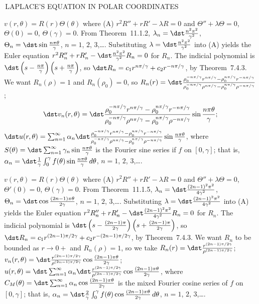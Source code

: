 \documentclass[dvips]{book}
\renewcommand{\exer}[1]{\par\medskip\;\noindent{\color{red}\bf #1.}}
\numberwithin{example}{section}
\numberwithin{equation}{section}
\numberwithin{theorem}{section}
\numberwithin{table}{section}
\numberwithin{figure}{section}
\begin{document}
\renewcommand{\thissection}{\sectiontitle
{\,LAPLACE'S EQUATION IN POLAR COORDINATES}}
\thissection

\vspace*{-17.5pt}

\exer{12.4.2}
 $v(r,\theta)=R(r)\Theta(\theta)$ where
(A) $r^2R''+rR'-\lambda R=0$ and
$\Theta''+\lambda\Theta=0$, $\Theta(0)=0$, $\Theta(\gamma)=0$.
From Theorem~11.1.2,
$\lambda_n=\dst\frac{n^2\pi^2}{\gamma^2}$,
 $\Theta_n=\dst\sin\frac
{n\pi\theta}{\gamma}$,
$n=1$,  $2$, $3$,\dots.
Substituting $\lambda=\dst\frac{n^2\pi^2}{\gamma^2}$ into (A) yields
the Euler equation
$r^2R_n''+rR_n'-\dst\frac{n^2\pi^2}{\gamma^2} R_n=0$
for $R_n$.
The indicial polynomial  is
$\dst
\left(s-\frac{n\pi}{\gamma}\right)
\left(s+\frac{n\pi}{\gamma}\right)$,
so
$\dst R_n=c_1r^{n\pi/\gamma}+c_2r^{-n\pi/\gamma}$,
by Theorem~7.4.3. We want $R_n(\rho)=1$ and $R_n(\rho_0)=0$, so
$R_n(r)=\dst\frac{\rho_0^{-n\pi/\gamma}r^{n\pi/\gamma}-\rho_0^{n\pi/\gamma}
r^{-n\pi/\gamma}}{\rho_0^{-n\pi/\gamma}\rho^{n\pi/\gamma}-\rho_0^{n\pi/\gamma}
\rho^{-n\pi/\gamma}}$;
$$
\dst v_n(r,\theta)=
\dst\frac{\rho_0^{-n\pi/\gamma}r^{n\pi/\gamma}-\rho_0^{n\pi/\gamma}
r^{-n\pi/\gamma}}{\rho_0^{-n\pi/\gamma}\rho^{n\pi/\gamma}-\rho_0^{n\pi/\gamma}
\rho^{-n\pi/\gamma}}
\sin\frac{n\pi\theta}{\gamma};
$$
$\dst u(r,\theta)=\sum_{n=1}^\infty\alpha_n
\dst\frac{\rho_0^{-n\pi/\gamma}r^{n\pi/\gamma}-\rho_0^{n\pi/\gamma}
r^{-n\pi/\gamma}}{\rho_0^{-n\pi/\gamma}\rho^{n\pi/\gamma}-\rho_0^{n\pi/\gamma}
\rho^{-n\pi/\gamma}}
\sin\frac{n\pi\theta}{\gamma}$,
where
$S(\theta)=\dst\sum_{n=1}^\infty\gamma_n\sin\frac{n\pi\theta}{\gamma}$
is the Fourier sine series if $f$ on $[0,\gamma]$; that is,
$\alpha_n=\dst\frac{1}{\gamma}\int_0^\gamma
f(\theta)\sin\frac{n\pi\theta}{\gamma}\,d\theta$, $n=1$, $2$,
$3$,\dots.


\exer{12.4.4}
 $v(r,\theta)=R(r)\Theta(\theta)$ where
(A) $r^2R''+rR'-\lambda R=0$ and
$\Theta''+\lambda\Theta=0$, $\Theta'(0)=0$, $\Theta(\gamma)=0$.
From Theorem~11.1.5,
$\lambda_n=\dst\frac{(2n-1)^2\pi^2}{4\gamma^2}$,
 $\Theta_n=\dst\cos\frac
{(2n-1)\pi\theta}{2\gamma}$,
$n=1$,  $2$, $3$,\dots.
Substituting $\lambda=\dst\frac{(2n-1)^2\pi^2}{4\gamma^2}$ into (A)
yields the Euler equation
$r^2R_n''+rR_n'-\dst\frac{(2n-1)^2\pi^2}{4\gamma^2} R_n=0$
for $R_n$.
The indicial polynomial  is
$\dst
\left(s-\frac{(2n-1)\pi}{2\gamma}\right)
\left(s+\frac{(2n-1)\pi}{2\gamma}\right)$,
so
$\dst R_n=c_1r^{(2n-1)\pi/2\gamma}+c_2r^{-(2n-1)\pi/2\gamma}$,
by Theorem~7.4.3. We want $R_n$  to be bounded as $r\to0+$ and
$R_n(\rho)=1$, so we take
$R_n(r)=\dst\frac{r^{(2n-1)\pi/2\gamma}}{\rho^{(2n-1)\pi/2\gamma}}$;
$v_n(r,\theta)=
\dst\frac{r^{(2n-1)\pi/2\gamma}}{\rho^{(2n-1)\pi/2\gamma}}
\cos\frac
{(2n-1)\pi\theta}{2\gamma}$;
$u(r,\theta)=\dst\sum_{n=1}^\infty\alpha_n
\dst\frac{r^{(2n-1)\pi/2\gamma}}{\rho^{(2n-1)\pi/2\gamma}}
\cos\frac
{(2n-1)\pi\theta}{2\gamma}$,
where
$C_M(\theta)=\dst\sum_{n=1}^\infty\alpha_n\cos\frac{(2n-1)\pi\theta}{2\gamma}$
is the mixed Fourier cosine series of $f$ on $[0,\gamma]$; that is,
$\alpha_n=\dst\frac{2}{\gamma}\int_0^\gamma
f(\theta)\cos\frac{(2n-1)\pi\theta}{2\gamma}\,d\theta$,\quad
 $n=1$, $2$, $3$,\dots.
\end{document}
